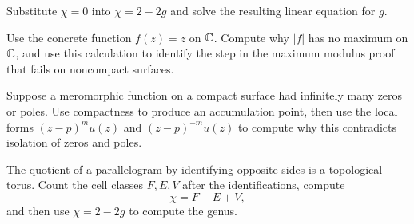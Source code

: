 \begin{exercise}
Substitute \(\chi=0\) into \(\chi=2-2g\) and solve the resulting linear equation
for \(g\).
\end{exercise}

\begin{exercise}
Use the concrete function \(f(z)=z\) on \(\mathbb{C}\).  Compute why \(|f|\) has no
maximum on \(\mathbb{C}\), and use this calculation to identify the step in the maximum
modulus proof that fails on noncompact surfaces.
\end{exercise}

\begin{exercise}
Suppose a meromorphic function on a compact surface had infinitely many zeros or
poles.  Use compactness to produce an accumulation point, then use the local
forms \((z-p)^m u(z)\) and \((z-p)^{-m}u(z)\) to compute why this contradicts
isolation of zeros and poles.
\end{exercise}

\begin{exercise}
The quotient of a parallelogram by identifying opposite sides is a topological
torus.  Count the cell classes \(F,E,V\) after the identifications, compute
\[
  \chi=F-E+V,
\]
and then use \(\chi=2-2g\) to compute the genus.
\end{exercise}
